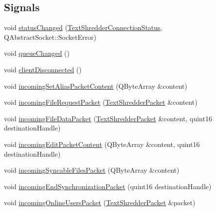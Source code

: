 \subsection*{Signals}
\begin{DoxyCompactItemize}
\item 
void \hyperlink{class_text_shredder_connection_aa6b9d6debcc65b64d75c13c5437a85dc}{statusChanged} (\hyperlink{textshredderconnection_8h_aaabbaef6c4c2aa19722167f8ca4becd5}{TextShredderConnectionStatus}, QAbstractSocket::SocketError)
\item 
void \hyperlink{class_text_shredder_connection_a462cfb59b4c2d365167e4e0b49481466}{queueChanged} ()
\item 
void \hyperlink{class_text_shredder_connection_ab9185876682aed490112abed9d7177b0}{clientDisconnected} ()
\item 
void \hyperlink{class_text_shredder_connection_a5bab096b78a0200272b355df17774504}{incomingSetAliasPacketContent} (QByteArray \&content)
\item 
void \hyperlink{class_text_shredder_connection_a71da9c9395f7e10cb928f74542512c8b}{incomingFileRequestPacket} (\hyperlink{class_text_shredder_packet}{TextShredderPacket} \&content)
\item 
void \hyperlink{class_text_shredder_connection_a5db139b45701c13d32e75854d9542afc}{incomingFileDataPacket} (\hyperlink{class_text_shredder_packet}{TextShredderPacket} \&content, quint16 destinationHandle)
\item 
void \hyperlink{class_text_shredder_connection_a0a23f1de22dc51a867bd9aeed0b69a1f}{incomingEditPacketContent} (QByteArray \&content, quint16 destinationHandle)
\item 
void \hyperlink{class_text_shredder_connection_a3b2c3340aa0bcb3cc3e19b9e4eb7b5ab}{incomingSyncableFilesPacket} (QByteArray \&content)
\item 
void \hyperlink{class_text_shredder_connection_aba8b7ccda944d149d7e007eaffe212c2}{incomingEndSynchronizationPacket} (quint16 destinationHandle)
\item 
void \hyperlink{class_text_shredder_connection_a83008f283cbcd16afc74606a113eeea3}{incomingOnlineUsersPacket} (\hyperlink{class_text_shredder_packet}{TextShredderPacket} \&packet)
\end{DoxyCompactItemize}

